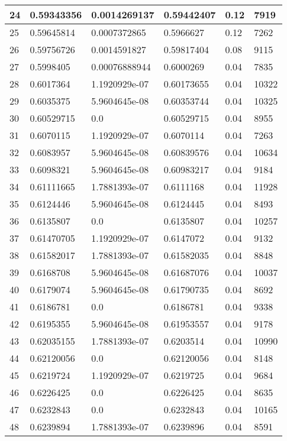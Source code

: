 \begin{longtable}{|l|l|l|l|l|l|}
24 & 0.59343356 & 0.0014269137 & 0.59442407 & 0.12 & 7919 \\ \hline 
25 & 0.59645814 & 0.0007372865 & 0.5966627 & 0.12 & 7262 \\ \hline 
26 & 0.59756726 & 0.0014591827 & 0.59817404 & 0.08 & 9115 \\ \hline 
27 & 0.5998405 & 0.00076888944 & 0.6000269 & 0.04 & 7835 \\ \hline 
28 & 0.6017364 & 1.1920929e-07 & 0.60173655 & 0.04 & 10322 \\ \hline 
29 & 0.6035375 & 5.9604645e-08 & 0.60353744 & 0.04 & 10325 \\ \hline 
30 & 0.60529715 & 0.0 & 0.60529715 & 0.04 & 8955 \\ \hline 
31 & 0.6070115 & 1.1920929e-07 & 0.6070114 & 0.04 & 7263 \\ \hline 
32 & 0.6083957 & 5.9604645e-08 & 0.60839576 & 0.04 & 10634 \\ \hline 
33 & 0.6098321 & 5.9604645e-08 & 0.60983217 & 0.04 & 9184 \\ \hline 
34 & 0.61111665 & 1.7881393e-07 & 0.6111168 & 0.04 & 11928 \\ \hline 
35 & 0.6124446 & 5.9604645e-08 & 0.6124445 & 0.04 & 8493 \\ \hline 
36 & 0.6135807 & 0.0 & 0.6135807 & 0.04 & 10257 \\ \hline 
37 & 0.61470705 & 1.1920929e-07 & 0.6147072 & 0.04 & 9132 \\ \hline 
38 & 0.61582017 & 1.7881393e-07 & 0.61582035 & 0.04 & 8848 \\ \hline 
39 & 0.6168708 & 5.9604645e-08 & 0.61687076 & 0.04 & 10037 \\ \hline 
40 & 0.6179074 & 5.9604645e-08 & 0.61790735 & 0.04 & 8692 \\ \hline 
41 & 0.6186781 & 0.0 & 0.6186781 & 0.04 & 9338 \\ \hline 
42 & 0.6195355 & 5.9604645e-08 & 0.61953557 & 0.04 & 9178 \\ \hline 
43 & 0.62035155 & 1.7881393e-07 & 0.6203514 & 0.04 & 10990 \\ \hline 
44 & 0.62120056 & 0.0 & 0.62120056 & 0.04 & 8148 \\ \hline 
45 & 0.6219724 & 1.1920929e-07 & 0.6219725 & 0.04 & 9684 \\ \hline 
46 & 0.6226425 & 0.0 & 0.6226425 & 0.04 & 8635 \\ \hline 
47 & 0.6232843 & 0.0 & 0.6232843 & 0.04 & 10165 \\ \hline 
48 & 0.6239894 & 1.7881393e-07 & 0.6239896 & 0.04 & 8591 \\ \hline 

\end{longtable}
